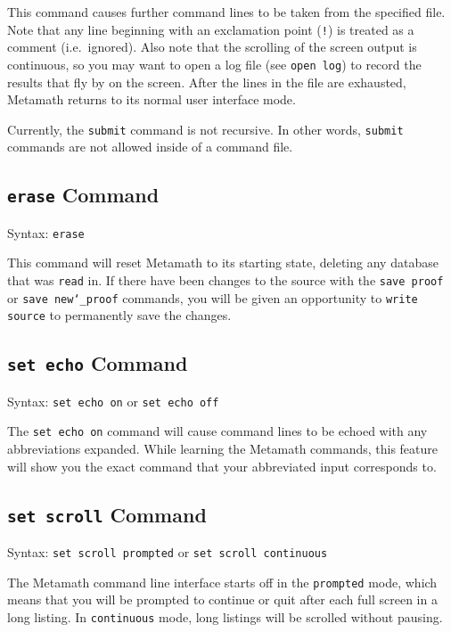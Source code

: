 This command causes further command lines to be taken from the specified
file.  Note that any line beginning with an exclamation point (\texttt{!}) is
treated as a comment (i.e.\ ignored).  Also note that the scrolling
of the screen output is continuous, so you may want to open a log file
(see \texttt{open log}) to record the results that fly by on the screen.
After the lines in the file are exhausted, Metamath returns to its
normal user interface mode.

Currently, the \texttt{submit} command is not recursive.  In other words,
\texttt{submit} commands are not allowed inside of a command file.


\subsection{\texttt{erase} Command}
Syntax:  \texttt{erase}

This command will reset Metamath to its starting state, deleting any
data\-base that was \texttt{read} in.
 If there have been changes to the
source with the \texttt{save proof} or \texttt{save new{\char`\_}proof}
commands, you will be given an opportunity to \texttt{write source} to
permanently save the changes.



\subsection{\texttt{set echo} Command}
Syntax:  \texttt{set echo on} or \texttt{set echo off}

The \texttt{set echo on} command will cause command lines to be echoed with any
abbreviations expanded.  While learning the Metamath commands, this
feature will show you the exact command that your abbreviated input
corresponds to.



\subsection{\texttt{set scroll} Command}
Syntax:  \texttt{set scroll prompted} or \texttt{set scroll continuous}

The Metamath command line interface starts off in the \texttt{prompted} mode,
which means that you will be prompted to continue or quit after each
full screen in a long listing.  In \texttt{continuous} mode, long listings will be
scrolled without pausing.

